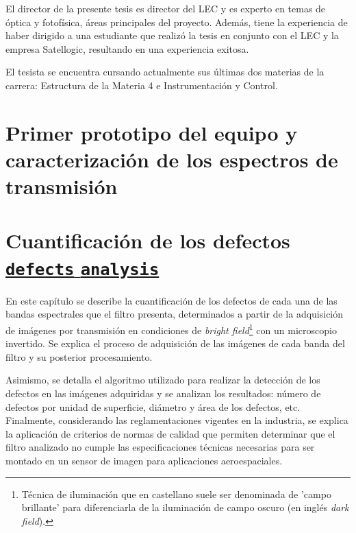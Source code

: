 \documentclass{ctuthesis}
\newcommand\Chapter[2]{\chapter[#1]{#1\\[1ex]\large#2}}
\begin{document}
El director de la presente tesis es director del LEC y es experto en temas de 
óptica y fotofísica, áreas principales del proyecto. Además, tiene la 
experiencia de haber dirigido a una estudiante que realizó la tesis en conjunto 
con el LEC y la empresa Satellogic, resultando en una experiencia exitosa.

El tesista se encuentra cursando actualmente sus últimas dos materias de la 
carrera: 
Estructura de la Materia 4 e Instrumentación y Control.


\renewcommand\bibname{Referencias Bibliográficas}




\chapter{Primer prototipo del equipo y caracterización de los espectros de transmisión}




\Chapter{Cuantificación de los defectos}{\textcolor{MidnightBlue}{\faGithub \href{https://github.com/jrr1984/defects_analysis}{\texttt{defects$\_$analysis}}}}
\hspace{0.5cm}En este capítulo se describe la cuantificación de los defectos de cada una de las bandas espectrales que el filtro presenta, determinados a partir de la adquisición de imágenes por transmisión en condiciones de \textit{bright field}\footnote{Técnica de iluminación que en castellano suele ser denominada de 'campo brillante' para diferenciarla de la iluminación de campo oscuro (en inglés \textit{dark field}).} con un microscopio invertido. Se explica el proceso de adquisición de las imágenes de cada banda del filtro y su posterior procesamiento. 

Asimismo, se detalla el algoritmo utilizado para realizar la detección de los defectos en las imágenes adquiridas y se analizan los resultados: número de defectos por unidad de superficie, diámetro y área de los defectos, etc. Finalmente, considerando las reglamentaciones vigentes en la industria, se explica la aplicación de criterios de normas de calidad que permiten determinar que el filtro analizado no cumple las especificaciones técnicas necesarias para ser montado en un sensor de imagen para aplicaciones aeroespaciales.
\end{document}
